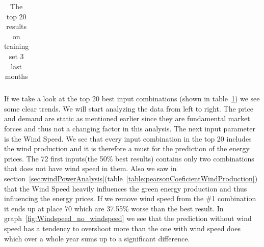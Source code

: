 \begin{table}[H]
{\begin{tabular}{|c|c|c|c|c|c|c|c|c|c|c|c|c|}
\end{tabular}
}
\caption{The top 20 results on training set 3 last months} %
\label{table:Top20Prices} %
\end{table}

If we take a look at the top 20 best input combinations (shown in table~\ref{table:Top20Prices}) we see some clear trends. We will start analyzing the data from left to right. The price and demand are static as mentioned earlier since they are fundamental market forces and thus not a changing factor in this analysis. The next input parameter is the Wind Speed. We see that every input combination in the top 20 includes the wind production and it is therefore a must for the prediction of the energy prices. The 72 first inputs(the 50\% best results) contains only two combinations that does not have wind speed in them. Also we saw in section~\ref{sec:windPowerAnalysis}(table~\ref{table:pearsonCoeficientWindProduction}) that the Wind Speed heavily influences the green energy production and thus influencing the energy prices. If we remove wind speed from the \#1 combination it ends up at place 70 which are 37.55\% worse than the best result. In graph~\ref{fig:Windspeed_no_windspeed} we see that the prediction without wind speed has a tendency to overshoot more than the one with wind speed does which over a whole year sums up to a significant difference. 

